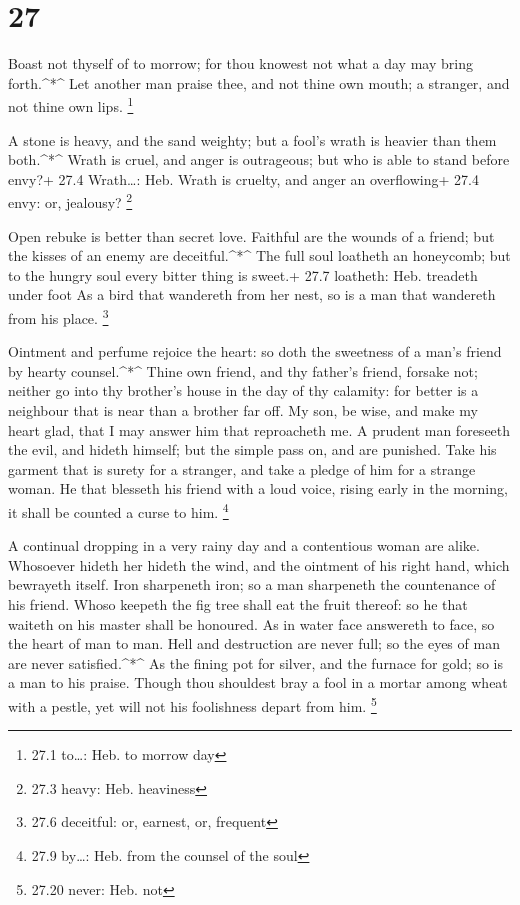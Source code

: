 \hypertarget{section-26}{%
\section{27}\label{section-26}}

 Boast not thyself of to morrow; for thou knowest not what a
day may bring forth.\^{}*\^{}  Let another man praise thee,
and not thine own mouth; a stranger, and not thine own lips. \footnote{27.1
  to\ldots: Heb. to morrow day}

 A stone is heavy, and the sand weighty; but a fool's wrath
is heavier than them both.\^{}*\^{}  Wrath is cruel, and
anger is outrageous; but who is able to stand before envy?+ 27.4
Wrath\ldots: Heb. Wrath is cruelty, and anger an overflowing+ 27.4 envy:
or, jealousy? \footnote{27.3 heavy: Heb. heaviness}

 Open rebuke is better than secret love. 
Faithful are the wounds of a friend; but the kisses of an enemy are
deceitful.\^{}*\^{}  The full soul loatheth an honeycomb;
but to the hungry soul every bitter thing is sweet.+ 27.7 loatheth: Heb.
treadeth under foot  As a bird that wandereth from her nest,
so is a man that wandereth from his place. \footnote{27.6 deceitful: or,
  earnest, or, frequent}

 Ointment and perfume rejoice the heart: so doth the
sweetness of a man's friend by hearty counsel.\^{}*\^{} 
Thine own friend, and thy father's friend, forsake not; neither go into
thy brother's house in the day of thy calamity: for better is a
neighbour that is near than a brother far off.  My son, be
wise, and make my heart glad, that I may answer him that reproacheth me.
 A prudent man foreseeth the evil, and hideth himself; but
the simple pass on, and are punished.  Take his garment
that is surety for a stranger, and take a pledge of him for a strange
woman.  He that blesseth his friend with a loud voice,
rising early in the morning, it shall be counted a curse to him.
\footnote{27.9 by\ldots: Heb. from the counsel of the soul}

 A continual dropping in a very rainy day and a contentious
woman are alike.  Whosoever hideth her hideth the wind, and
the ointment of his right hand, which bewrayeth itself. 
Iron sharpeneth iron; so a man sharpeneth the countenance of his friend.
 Whoso keepeth the fig tree shall eat the fruit thereof: so
he that waiteth on his master shall be honoured.  As in
water face answereth to face, so the heart of man to man. 
Hell and destruction are never full; so the eyes of man are never
satisfied.\^{}*\^{}  As the fining pot for silver, and the
furnace for gold; so is a man to his praise.  Though thou
shouldest bray a fool in a mortar among wheat with a pestle, yet will
not his foolishness depart from him. \footnote{27.20 never: Heb. not}

